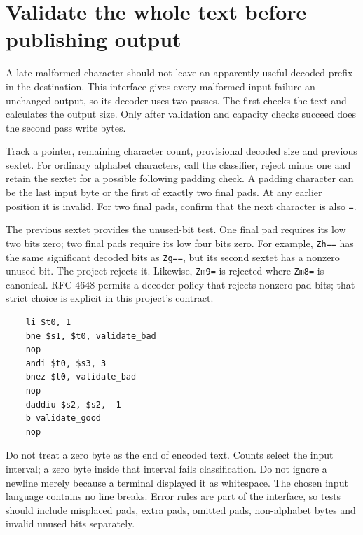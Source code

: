 \section{Validate the whole text before publishing output}
A late malformed character should not leave an apparently useful decoded prefix in
the destination. This interface gives every malformed-input failure an unchanged output,
so its decoder uses two passes. The first checks the text and calculates the output
size. Only after validation and capacity checks succeed does the second pass write bytes.

Track a pointer, remaining character count, provisional decoded size and previous sextet.
For ordinary alphabet characters, call the classifier, reject minus one and retain the
sextet for a possible following padding check. A padding character can be the last input
byte or the first of exactly two final pads. At any earlier position it is invalid.
For two final pads, confirm that the next character is also \texttt{=}.

The previous sextet provides the unused-bit test. One final pad requires its low two
bits zero; two final pads require its low four bits zero. For example, \texttt{Zh==}
has the same significant decoded bits as \texttt{Zg==}, but its second sextet has a
nonzero unused bit. The project rejects it. Likewise, \texttt{Zm9=} is rejected where
\texttt{Zm8=} is canonical. RFC 4648 permits a decoder policy that rejects nonzero pad
bits; that strict choice is explicit in this project's contract.

\begin{verbatim}
    li $t0, 1
    bne $s1, $t0, validate_bad
    nop
    andi $t0, $s3, 3
    bnez $t0, validate_bad
    nop
    daddiu $s2, $s2, -1
    b validate_good
    nop
\end{verbatim}

Do not treat a zero byte as the end of encoded text. Counts select the input interval;
a zero byte inside that interval fails classification. Do not ignore a newline merely
because a terminal displayed it as whitespace. The chosen input language contains no
line breaks. Error rules are part of the interface, so tests should include misplaced
pads, extra pads, omitted pads, non-alphabet bytes and invalid unused bits separately.
